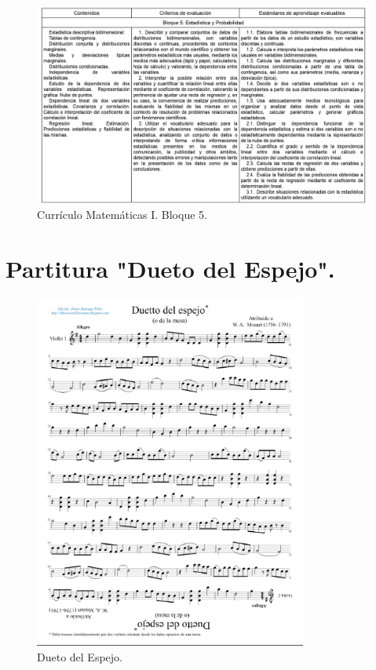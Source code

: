 \documentclass[a4paper, openright, 11pt, titlepage]{report}
\theoremstyle{definition}\newtheorem{defin}[propo]{Definition}
\theoremstyle{definition}\newtheorem{obser}[propo]{Remark}
\theoremstyle{definition}\newtheorem{ejem}[propo]{Ejemplo}
\theoremstyle{definition}\newtheorem{algoritmo}[propo]{Algoritmo}
\begin{document}
  \begin{figure}[H]
     \centering
     \includegraphics[width = 1.1\textwidth]{Images/Apéndices/Apéndice B/curriculo4.png}
     \caption{Currículo Matemáticas I. Bloque 5.}
 \end{figure}
\chapter{Partitura "Dueto del Espejo".}
\begin{figure}[H]
    \centering
    \includegraphics[width = 0.8\textwidth]{Images/Apéndices/Apéndice C/duettoMozart.png}
    \caption{Dueto del Espejo.}
    \label{fig:my_label}
\end{figure}
\end{document}

